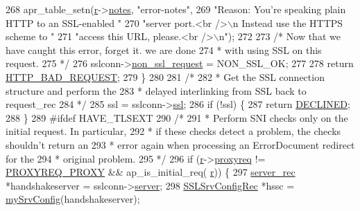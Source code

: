 \begin{DoxyCode}
268         apr\_table\_setn(\hyperlink{group__APACHE__CORE__CONFIG_ga091cdd45984e865a888a4f8bb8fe107a}{r}->\hyperlink{structrequest__rec_a8be66d4328766cf1da8913c9b51e0e30}{notes}, \textcolor{stringliteral}{"error-notes"},
269                        \textcolor{stringliteral}{"Reason: You're speaking plain HTTP to an SSL-enabled "}
270                        \textcolor{stringliteral}{"server port.<br />\(\backslash\)n Instead use the HTTPS scheme to "}
271                        \textcolor{stringliteral}{"access this URL, please.<br />\(\backslash\)n"});
272 
273         \textcolor{comment}{/* Now that we have caught this error, forget it. we are done}
274 \textcolor{comment}{         * with using SSL on this request.}
275 \textcolor{comment}{         */}
276         sslconn->\hyperlink{structSSLConnRec_ad8e5a6eab97a14984224072bdcaeb49b}{non\_ssl\_request} = NON\_SSL\_OK;
277 
278         \textcolor{keywordflow}{return} \hyperlink{group__HTTP__Status_ga0c1fdbbb10800664989907cbd3a5a023}{HTTP\_BAD\_REQUEST};
279     \}
280 
281     \textcolor{comment}{/*}
282 \textcolor{comment}{     * Get the SSL connection structure and perform the}
283 \textcolor{comment}{     * delayed interlinking from SSL back to request\_rec}
284 \textcolor{comment}{     */}
285     ssl = sslconn->\hyperlink{structSSLConnRec_acc0257b6ed74d7c6aee8f1a3447df6b5}{ssl};
286     \textcolor{keywordflow}{if} (!ssl) \{
287         \textcolor{keywordflow}{return} \hyperlink{group__APACHE__CORE__DAEMON_ga9eba11ca86461a3ae319311d64682dda}{DECLINED};
288     \}
289 \textcolor{preprocessor}{#ifdef HAVE\_TLSEXT}
290     \textcolor{comment}{/*}
291 \textcolor{comment}{     * Perform SNI checks only on the initial request.  In particular,}
292 \textcolor{comment}{     * if these checks detect a problem, the checks shouldn't return an}
293 \textcolor{comment}{     * error again when processing an ErrorDocument redirect for the}
294 \textcolor{comment}{     * original problem.}
295 \textcolor{comment}{     */}
296     \textcolor{keywordflow}{if} (\hyperlink{group__APACHE__CORE__CONFIG_ga091cdd45984e865a888a4f8bb8fe107a}{r}->\hyperlink{structrequest__rec_a82ca03c6dcfcacbf7001ff85e462289d}{proxyreq} != \hyperlink{group__ProxyReq_gaa879e84f9b9d334007ef4c542bf6374e}{PROXYREQ\_PROXY} && ap\_is\_initial\_req(
      \hyperlink{group__APACHE__CORE__CONFIG_ga091cdd45984e865a888a4f8bb8fe107a}{r})) \{
297         \hyperlink{structserver__rec}{server\_rec} *handshakeserver = sslconn->\hyperlink{structSSLConnRec_aae4b90a2b0affa02e0b081f167052bb9}{server};
298         \hyperlink{structSSLSrvConfigRec}{SSLSrvConfigRec} *hssc = \hyperlink{group__MOD__SSL__PRIVATE_ga3ea8e2c288a4f4af189ae0fc4f1fd996}{mySrvConfig}(handshakeserver);

\end{DoxyCode}
